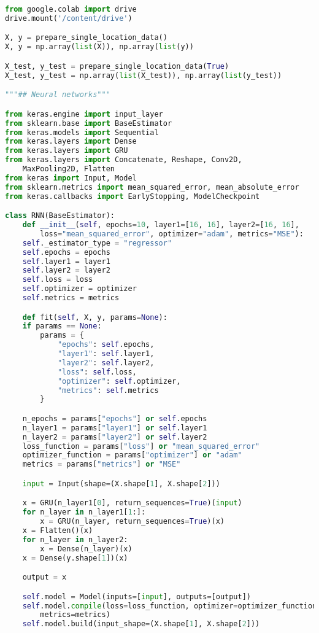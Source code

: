 \begin{lstlisting}[label=python-listing,caption={Kod źródłowy},language=python]
from google.colab import drive
drive.mount('/content/drive')

X, y = prepare_single_location_data()
X, y = np.array(list(X)), np.array(list(y))

X_test, y_test = prepare_single_location_data(True)
X_test, y_test = np.array(list(X_test)), np.array(list(y_test))

"""## Neural networks"""

from keras.engine import input_layer
from sklearn.base import BaseEstimator
from keras.models import Sequential 
from keras.layers import Dense 
from keras.layers import GRU
from keras.layers import Concatenate, Reshape, Conv2D, 
    MaxPooling2D, Flatten
from keras import Input, Model
from sklearn.metrics import mean_squared_error, mean_absolute_error
from keras.callbacks import EarlyStopping, ModelCheckpoint

class RNN(BaseEstimator):
    def __init__(self, epochs=10, layer1=[16, 16], layer2=[16, 16], 
        loss="mean_squared_error", optimizer="adam", metrics="MSE"):
    self._estimator_type = "regressor"
    self.epochs = epochs
    self.layer1 = layer1
    self.layer2 = layer2
    self.loss = loss
    self.optimizer = optimizer
    self.metrics = metrics

    def fit(self, X, y, params=None):
    if params == None:
        params = {
            "epochs": self.epochs,
            "layer1": self.layer1,
            "layer2": self.layer2,
            "loss": self.loss,
            "optimizer": self.optimizer,
            "metrics": self.metrics
        }

    n_epochs = params["epochs"] or self.epochs
    n_layer1 = params["layer1"] or self.layer1
    n_layer2 = params["layer2"] or self.layer2
    loss_function = params["loss"] or "mean_squared_error"
    optimizer_function = params["optimizer"] or "adam"
    metrics = params["metrics"] or "MSE"

    input = Input(shape=(X.shape[1], X.shape[2]))

    x = GRU(n_layer1[0], return_sequences=True)(input)
    for n_layer in n_layer1[1:]:
        x = GRU(n_layer, return_sequences=True)(x)
    x = Flatten()(x)
    for n_layer in n_layer2:
        x = Dense(n_layer)(x)
    x = Dense(y.shape[1])(x)

    output = x

    self.model = Model(inputs=[input], outputs=[output])
    self.model.compile(loss=loss_function, optimizer=optimizer_function, 
        metrics=metrics) 
    self.model.build(input_shape=(X.shape[1], X.shape[2]))


\end{lstlisting}
